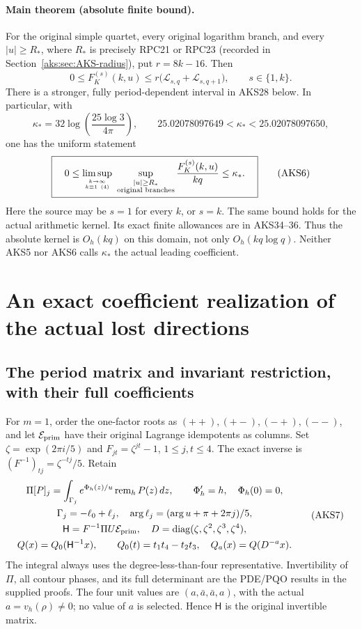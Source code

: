 \documentclass[11pt,a4paper]{article}
\begin{document}
\paragraph{Main theorem (absolute finite bound).}
For the original simple quartet, every original logarithm branch, and
every $|u|\ge R_*$, where $R_*$ is precisely RPC21 or RPC23 (recorded in
Section~\ref{aks:sec:AKS-radius}), put $r=8k-16$. Then
\[
 \boxed{\quad
 0\le F_K^{(s)}(k,u)\le r\bigl(\mathcal L_{s,q}+\mathcal L_{s,q+1}\bigr),
 \qquad s\in\{1,k\}.\quad}
 \tag{AKS4}
\]
There is a stronger, fully period-dependent interval in AKS28 below.
In particular, with
\[
 \kappa_* =32\log\left(\frac{25\log3}{4\pi}\right),
 \qquad 25.02078097649<\kappa_*<25.02078097650,
 \tag{AKS5}
\]
one has the uniform statement
\[
 \boxed{\quad
 0\le\limsup_{k\to\infty\atop k\equiv1\ (4)}
       \ \sup_{\substack{|u|\ge R_*\\\text{original branches}}}
         \frac{F_K^{(s)}(k,u)}{kq}\le\kappa_*.
 \quad}\tag{AKS6}
\]
Here the source may be $s=1$ for every $k$, or $s=k$. The same bound holds
for the actual arithmetic kernel. Its exact finite allowances are in
AKS34--36. Thus the absolute kernel is $O_h(kq)$ on this domain, not only
$O_h(kq\log q)$. Neither AKS5 nor AKS6 calls $\kappa_*$ the actual leading
coefficient.

\section{An exact coefficient realization of the actual lost directions}
\label{aks:sec:AKS-frame}

\subsection{The period matrix and invariant restriction, with their full coefficients}
For $m=1$, order the one-factor roots as $(++),(+-),(-+),(--)$, and let
$\mathcal E_{\rm prim}$ have their original Lagrange idempotents as columns.
Set $\zeta=\exp(2\pi i/5)$ and $F_{jt}=\zeta^{jt}-1$, $1\le j,t\le4$.
The exact inverse is $(F^{-1})_{tj}=\zeta^{-tj}/5$. Retain
\[
\begin{gathered}
 \Pi[P]_j=\int_{\Gamma_j}e^{\Phi_h(z)/u}\operatorname{rem}_hP(z)\,dz,
 \qquad\Phi_h'=h,\quad\Phi_h(0)=0,\\
 \Gamma_j=-\ell_0+\ell_j,\quad
 \arg\ell_j=(\arg u+\pi+2\pi j)/5,\\
 \mathsf H=F^{-1}\Pi U\mathcal E_{\rm prim},\quad
 D=\operatorname{diag}(\zeta,\zeta^2,\zeta^3,\zeta^4),\\
 Q(x)=Q_0(\mathsf H^{-1}x),\qquad
 Q_0(t)=t_1t_4-t_2t_3,\quad Q_a(x)=Q(D^{-a}x).
\end{gathered}\tag{AKS7}
\]
The integral always uses the degree-less-than-four representative.
Invertibility of $\Pi$, all contour phases, and its full determinant are
the PDE/PQO results in the supplied proofs. The four unit values are
$(a,\bar a,\bar a,a)$, with the actual $a=v_h(\rho)\ne0$; no value of $a$
is selected. Hence $\mathsf H$ is the original invertible matrix.
\end{document}
